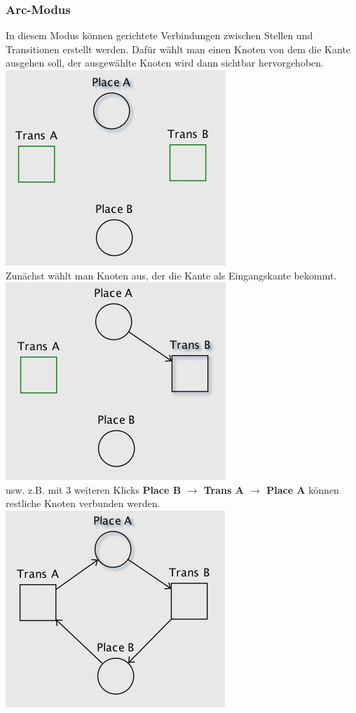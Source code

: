 \documentclass[12pt]{article}
\begin{document}
\subsubsection{Arc-Modus}
In diesem Modus können gerichtete Verbindungen zwischen Stellen und Transitionen erstellt werden. Dafür wählt man einen Knoten von dem die Kante ausgehen soll, der ausgewählte Knoten wird dann sichtbar hervorgehoben. \\
\includegraphics[scale=0.6]{arc_mode1} \\
Zunächst wählt man Knoten aus, der die Kante als Eingangskante bekommt.\\
\includegraphics[scale=0.6]{arc_mode2} \\
usw. z.B. mit 3 weiteren Klicks \textbf{Place B $\rightarrow$ Trans A $\rightarrow$ Place A} können restliche Knoten verbunden werden. \\
\includegraphics[scale=0.6]{arc_mode3} \\
\end{document}
